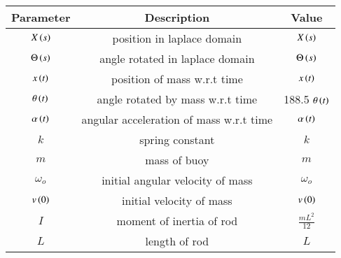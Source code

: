 \begin{tabular}{|c|c|c|}
    \hline
    \textbf{Parameter} & \textbf{Description} & \textbf{Value} \\
    \hline
    $X\left(s\right)$ & position in laplace domain & $ X\left(s\right)$ \\
    \hline
    $\Theta\left(s\right)$ & angle rotated in laplace domain & $ \Theta\left(s\right)$ \\
    \hline
    $x\left(t\right)$ & position of mass w.r.t time & $x\left(t\right)$ \\
    \hline
    $\theta\left(t\right)$ & angle rotated by mass w.r.t time &188.5 $ \theta\left(t\right)$\\
    \hline
    $\alpha\left(t\right)$ & angular acceleration of mass w.r.t time & $\alpha\left(t\right)$ \\
    \hline
    $k$ & spring constant & $ k$\\
    \hline
    $m$ & mass of buoy & $ m$\\
    \hline
    $\omega_o$ & initial angular velocity of mass & $ \omega_o$ \\
    \hline
    $v\left(0\right)$ & initial velocity of mass& $ v\left(0\right)$ \\
    \hline
    $I$ & moment of inertia of rod& $ \frac{mL^2}{12}$ \\
    \hline
    $L$ & length of rod& $ L$ \\
    \hline
    
\end{tabular}





